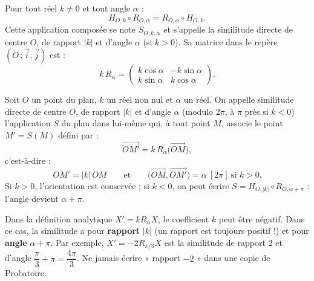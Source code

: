 \documentclass[11pt]{article}
\newcommand{\cle}[1]{{\popxbold\color{popdark}#1}}
\begin{document}
\begin{propriete}
Pour tout réel $k \neq 0$ et tout angle $\alpha$ :
\[
H_{O,k} \circ R_{O,\alpha} = R_{O,\alpha} \circ H_{O,k}.
\]
Cette application composée se note $S_{O,k,\alpha}$ et s'appelle la \cle{similitude directe} de centre $O$, de rapport $|k|$ et d'angle $\alpha$ (si $k>0$). Sa matrice dans le repère $(O\,;\vec{i},\vec{j})$ est :
\[
k\,R_\alpha = \begin{pmatrix} k\cos\alpha & -k\sin\alpha \\ k\sin\alpha & k\cos\alpha \end{pmatrix}.
\]
\end{propriete}

\begin{definition}
Soit $O$ un point du plan, $k$ un réel non nul et $\alpha$ un réel. On appelle \cle{similitude directe} de centre $O$, de rapport $|k|$ et d'angle $\alpha$ (modulo $2\pi$, à $\pi$ près si $k<0$) l'application $S$ du plan dans lui-même qui, à tout point $M$, associe le point $M' = S(M)$ défini par :
\[
\overrightarrow{OM'} = k\,R_\alpha\big(\overrightarrow{OM}\big),
\]
c'est-à-dire :
\[
OM' = |k|\,OM \qquad\text{et}\qquad \big(\overrightarrow{OM},\overrightarrow{OM'}\big) = \alpha \ [2\pi] \ \text{si } k>0.
\]
Si $k > 0$, l'orientation est conservée ; si $k < 0$, on peut écrire $S = H_{O,|k|} \circ R_{O,\alpha+\pi}$ : l'angle devient $\alpha + \pi$.
\end{definition}

\begin{attention}
Dans la définition analytique $X' = kR_\alpha X$, le coefficient $k$ peut être négatif. Dans ce cas, la similitude a pour \textbf{rapport} $|k|$ (un rapport est toujours positif !) et pour \textbf{angle} $\alpha + \pi$. Par exemple, $X' = -2 R_{\pi/3} X$ est la similitude de rapport $2$ et d'angle $\dfrac{\pi}{3} + \pi = \dfrac{4\pi}{3}$. Ne jamais écrire « rapport $-2$ » dans une copie de Probatoire.
\end{attention}
\end{document}
